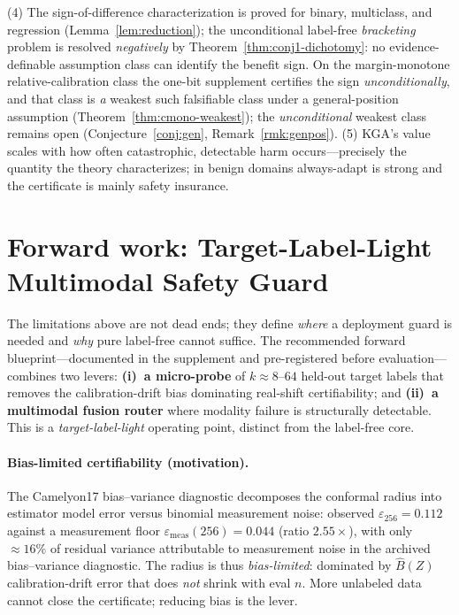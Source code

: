 \documentclass[conference]{IEEEtran}
\theoremstyle{plain}
\theoremstyle{definition}
\begin{document}
(4) The sign-of-difference characterization is proved for binary, multiclass, and
regression (Lemma~\ref{lem:reduction}); the unconditional label-free \emph{bracketing}
problem is resolved \emph{negatively} by Theorem~\ref{thm:conj1-dichotomy}: no
evidence-definable assumption class can identify the benefit sign. On the margin-monotone
relative-calibration class the one-bit supplement certifies the sign \emph{unconditionally}, and
that class is \emph{a} weakest such falsifiable class under a general-position assumption
(Theorem~\ref{thm:cmono-weakest}); the \emph{unconditional} weakest class remains open
(Conjecture~\ref{conj:gen}, Remark~\ref{rmk:genpos}).
(5) \textsc{KGA}'s value scales with how often catastrophic, detectable harm
occurs---precisely the quantity the theory characterizes; in benign domains
always-adapt is strong and the certificate is mainly safety insurance.
\clearpage

\section{Forward work: Target-Label-Light Multimodal Safety Guard}\label{sec:forward-tll}
The limitations above are not dead ends; they define \emph{where} a deployment guard is needed and
\emph{why} pure label-free cannot suffice. The recommended forward blueprint---documented in the
supplement and pre-registered before evaluation---combines two levers:
\textbf{(i)~a micro-probe} of $k{\approx}8$--$64$ held-out target labels that removes the
calibration-drift bias dominating real-shift certifiability; and \textbf{(ii)~a multimodal fusion
router} where modality failure is structurally detectable. This is a \emph{target-label-light}
operating point, distinct from the label-free core.

\paragraph{Bias-limited certifiability (motivation).}
The Camelyon17 bias--variance diagnostic decomposes the conformal radius into estimator model error
versus binomial measurement noise: observed $\varepsilon_{256}{=}0.112$ against a measurement floor
$\varepsilon_{\mathrm{meas}}(256){=}0.044$ (ratio $2.55{\times}$), with only $\approx\!16\%$ of
residual variance attributable to measurement noise
in the archived bias--variance diagnostic. The radius is thus
\emph{bias-limited}: dominated by $\widehat{B}(Z)$ calibration-drift error that does \emph{not}
shrink with eval $n$. More unlabeled data cannot close the certificate; reducing bias is the lever.
\end{document}
